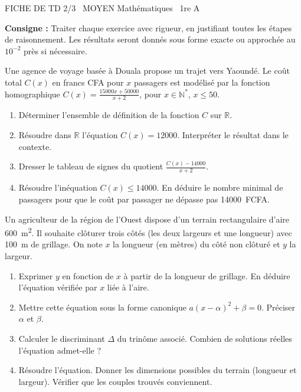 \documentclass[11pt]{article}
\begin{document}
\begin{tcolorbox}[enhanced,colback=popink,colframe=popink,arc=10pt,boxrule=0pt,left=12pt,right=12pt,top=9pt,bottom=9pt]
{\color{white}\popxbold\small FICHE DE TD 2/3 \textbullet\ MOYEN \hfill Mathématiques \textbullet\ 1re A\par}
\end{tcolorbox}
\vspace{4pt}
\noindent \textbf{Consigne :} Traiter chaque exercice avec rigueur, en justifiant toutes les étapes de raisonnement. Les résultats seront donnés sous forme exacte ou approchée au $10^{-2}$ près si nécessaire.

\begin{exercice}
Une agence de voyage basée à Douala propose un trajet vers Yaoundé. Le coût total $C(x)$ en francs CFA pour $x$ passagers est modélisé par la fonction homographique $C(x) = \frac{15000x + 50000}{x + 2}$, pour $x \in \mathbb{N}^*$, $x \leq 50$.
\begin{enumerate}
    \item Déterminer l'ensemble de définition de la fonction $C$ sur $\mathbb{R}$.
    \item Résoudre dans $\mathbb{R}$ l'équation $C(x) = 12000$. Interpréter le résultat dans le contexte.
    \item Dresser le tableau de signes du quotient $\frac{C(x) - 14000}{x+2}$.
    \item Résoudre l'inéquation $C(x) \leq 14000$. En déduire le nombre minimal de passagers pour que le coût par passager ne dépasse pas \SI{14000}{FCFA}.
\end{enumerate}
\end{exercice}

\begin{exercice}
Un agriculteur de la région de l'Ouest dispose d'un terrain rectangulaire d'aire \SI{600}{m^2}. Il souhaite clôturer trois côtés (les deux largeurs et une longueur) avec \SI{100}{m} de grillage. On note $x$ la longueur (en mètres) du côté non clôturé et $y$ la largeur.
\begin{enumerate}
    \item Exprimer $y$ en fonction de $x$ à partir de la longueur de grillage. En déduire l'équation vérifiée par $x$ liée à l'aire.
    \item Mettre cette équation sous la forme canonique $a(x-\alpha)^2 + \beta = 0$. Préciser $\alpha$ et $\beta$.
    \item Calculer le discriminant $\Delta$ du trinôme associé. Combien de solutions réelles l'équation admet-elle ?
    \item Résoudre l'équation. Donner les dimensions possibles du terrain (longueur et largeur). Vérifier que les couples trouvés conviennent.
\end{enumerate}
\end{exercice}
\end{document}
